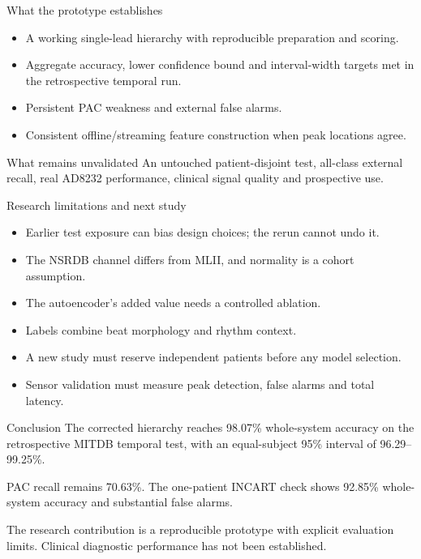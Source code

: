 \documentclass[aspectratio=169,11pt]{beamer}
\begin{document}
\begin{frame}{What the prototype establishes}
\begin{itemize}
\item A working single-lead hierarchy with reproducible preparation and scoring.
\item Aggregate accuracy, lower confidence bound and interval-width targets
met in the retrospective temporal run.
\item Persistent PAC weakness and external false alarms.
\item Consistent offline/streaming feature construction when peak locations agree.
\end{itemize}
\begin{alertblock}{What remains unvalidated}
An untouched patient-disjoint test, all-class external recall, real AD8232
performance, clinical signal quality and prospective use.
\end{alertblock}
\end{frame}

\begin{frame}{Research limitations and next study}
\begin{itemize}
\item Earlier test exposure can bias design choices; the rerun cannot undo it.
\item The NSRDB channel differs from MLII, and normality is a cohort assumption.
\item The autoencoder's added value needs a controlled ablation.
\item Labels combine beat morphology and rhythm context.
\item A new study must reserve independent patients before any model selection.
\item Sensor validation must measure peak detection, false alarms and total latency.
\end{itemize}
\end{frame}

\begin{frame}{Conclusion}
The corrected hierarchy reaches 98.07\% whole-system accuracy on the
retrospective MITDB temporal test, with an equal-subject 95\% interval of
96.29--99.25\%.
\medskip

PAC recall remains 70.63\%. The one-patient INCART check shows 92.85\%
whole-system accuracy and substantial false alarms.
\medskip

The research contribution is a reproducible prototype with explicit
evaluation limits. Clinical diagnostic performance has not been established.
\end{frame}
\end{document}
